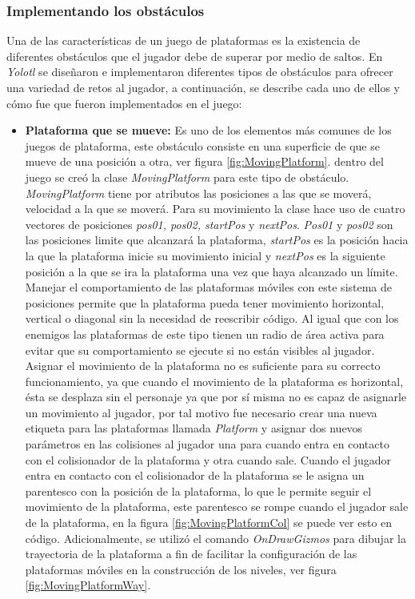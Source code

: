 \subsubsection{Implementando los obstáculos}
Una de las características de un juego de plataformas es la existencia de diferentes 
obstáculos que el jugador debe de superar por medio de saltos\cite{Ref_JuegoDisenio}. 
En \textit{Yolotl} se diseñaron e implementaron diferentes tipos de obstáculos 
para ofrecer una variedad de retos al jugador, a continuación, se describe cada 
uno de ellos y cómo fue que fueron implementados en el juego:
	\begin{itemize}
		\item \textbf{Plataforma que se mueve:} Es uno de los elementos más comunes de 
		los juegos de plataforma, este   obstáculo consiste en una superficie de que 
		se mueve de una posición a otra, ver figura \ref{fig:MovingPlatform}. dentro 
		del juego se creó la clase \textit{MovingPlatform} para este tipo de obstáculo. 
		\textit{MovingPlatform} tiene por atributos las posiciones a las que se moverá, 
		velocidad a la que se moverá. Para su movimiento la clase hace uso de cuatro 
		vectores de posiciones \textit{pos01, pos02, startPos} y \textit{nextPos}. 
		\textit{Pos01} y \textit{pos02} son las posiciones limite que alcanzará la 
		plataforma, \textit{startPos} es la posición hacia la que la plataforma inicie 
		su movimiento inicial y \textit{nextPos} es la siguiente posición a la que se 
		ira la plataforma una vez que haya alcanzado un límite. Manejar el 
		comportamiento de las plataformas móviles con este sistema de posiciones 
		permite que la plataforma pueda tener movimiento horizontal, vertical o diagonal 
		sin la necesidad de reescribir código. Al igual que con los enemigos las 
		plataformas de este tipo tienen un radio de área activa para evitar que su 
		comportamiento se ejecute si no están visibles al jugador. Asignar el movimiento 
		de la plataforma no es suficiente para su correcto funcionamiento, ya que 
		cuando el movimiento de la plataforma es horizontal, ésta se desplaza sin el 
		personaje ya que por sí misma no es capaz de asignarle un movimiento al jugador, 
		por tal motivo fue necesario crear una nueva etiqueta para las plataformas 
		llamada \textit{Platform} y asignar dos nuevos parámetros en las colisiones 
		al jugador 
		una para cuando entra en contacto con el colisionador de la plataforma y otra 
		cuando sale. Cuando el jugador entra en contacto con el colisionador de la 
		plataforma se le asigna un parentesco con la posición de la plataforma, lo 
		que le permite seguir el movimiento de la plataforma, este parentesco se 
		rompe cuando el jugador sale de la plataforma, en la figura 
		\ref{fig:MovingPlatformCol} se puede ver esto en código. Adicionalmente, 
		se utilizó el comando \textit{OnDrawGizmos} para dibujar la trayectoria de la 
		plataforma a fin de facilitar la configuración de las plataformas móviles en la 
		construcción de los niveles, ver figura \ref{fig:MovingPlatformWay}.
			

\end{itemize}

